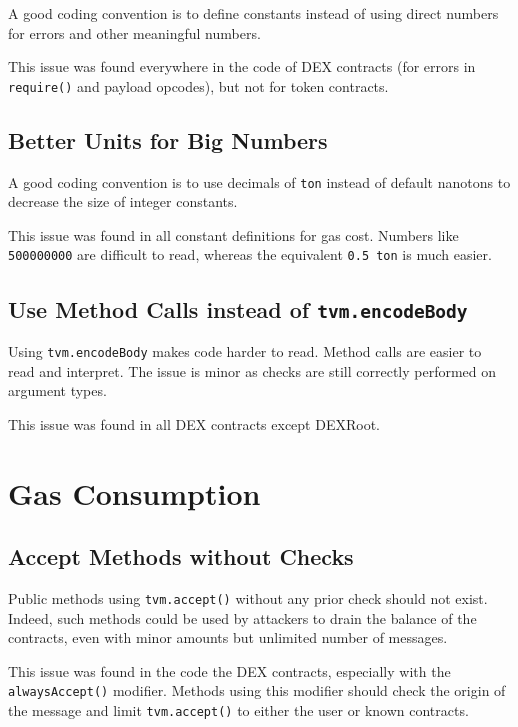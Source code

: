 A good coding convention is to define constants instead of using
direct numbers for errors and other meaningful numbers.

This issue was found everywhere in the code of DEX contracts (for
errors in {\tt require()} and payload opcodes), but not for token
contracts.

\subsection{Better Units for Big Numbers}
\label{readability:numbers}

A good coding convention is to use decimals of {\tt ton} instead of
default nanotons to decrease the size of integer constants.

This issue was found in all constant definitions for gas cost.
Numbers like {\tt 500000000} are difficult to read, whereas the
equivalent {\tt 0.5 ton} is much easier.

\subsection{Use Method Calls instead of {\tt tvm.encodeBody}}
\label{readability:call}

Using {\tt tvm.encodeBody} makes code harder to read. Method calls are
easier to read and interpret. The issue is minor as checks are still
correctly performed on argument types.

This issue was found in all DEX contracts except DEXRoot.

\section{Gas Consumption}

\subsection{Accept Methods without Checks}
\label{accept:all}

Public methods using {\tt tvm.accept()} without any prior check should
not exist. Indeed, such methods could be used by attackers to drain
the balance of the contracts, even with minor amounts but unlimited
number of messages.

This issue was found in the code the DEX contracts, especially with
the {\tt alwaysAccept()} modifier. Methods using this modifier should
check the origin of the message and limit {\tt tvm.accept()} to either
the user or known contracts.

